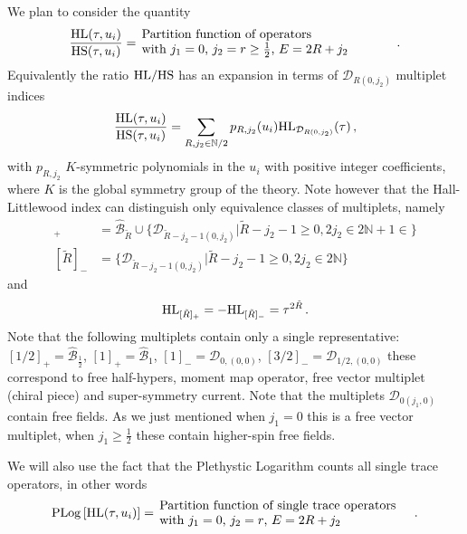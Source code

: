 \documentclass[main.tex]{subfiles}
\begin{document}
We plan to consider the quantity
\begin{equation}
\frac{\HL(\tau,u_i)}{\HS(\tau,u_i)}=\,\parbox{20em}{Partition function of operators \\with  $j_1=0$, $j_2=r\geq\frac{1}{2}$, $E=2R+j_2$}\,.
\end{equation}
Equivalently the ratio $\textrm{HL}/\textrm{HS}$ has an expansion in terms of $\mathcal{D}_{R(0,j_2)}$ multiplet indices
\begin{equation}
\frac{\textrm{HL}(\tau,u_i)}{\textrm{HS}(\tau,u_i)}=\sum_{R,j_2\in\mathbb{N}/2}p_{R,j_2}(u_i)\textrm{HL}_{\mathcal{D}_{R(0,j_2)}}(\tau)\,,
\end{equation}
with $p_{R,j_2}$ $K$-symmetric polynomials in the $u_i$ with positive integer coefficients, where $K$ is the global symmetry group of the theory.
Note however that the Hall-Littlewood index can distinguish only equivalence classes of multiplets, namely
\begin{align}
[\tilde{R}]_+&=\hat{\mathcal{B}}_{\tilde{R}}\cup\{\mathcal{D}_{\tilde{R}-j_2-1(0,j_2)}|\tilde{R}-j_2-1\geq0,2j_2\in2\mathbb{N}+1\in\}\\
[\tilde{R}]_-&=\{\mathcal{D}_{\tilde{R}-j_2-1(0,j_2)}|\tilde{R}-j_2-1\geq0,2j_2\in2\mathbb{N}\}
\end{align}
and
\begin{equation}
\textrm{HL}_{[\tilde{R}]_+}=-\textrm{HL}_{[\tilde{R}]_-}=\tau^{2\tilde{R}}\,.
\end{equation}
Note that the following multiplets contain only a single representative: $[1/2]_+=\hat{\mathcal{B}}_{\frac{1}{2}}$, $[1]_+=\hat{\mathcal{B}}_1$,  $[1]_-=\mathcal{D}_{0,(0,0)}$, $[3/2]_-=\mathcal{D}_{1/2,(0,0)}$ these correspond to free half-hypers, moment map operator, free vector multiplet (chiral piece) and super-symmetry current. Note that the multiplets $\mathcal{D}_{0(j_1,0)}$ contain free fields. As we just mentioned when $j_1=0$ this is a free vector multiplet, when $j_1\geq\frac{1}{2}$ these contain higher-spin free fields.

We will also use the fact that the Plethystic Logarithm counts all single trace operators, in other words
\begin{align}
\PLog\left[\HL(\tau,u_i)\right]=\,\parbox{20em}{Partition function of single trace operators\newline with  $j_1=0$, $j_2=r$, $E=2R+j_2$ }\,.
\end{align}
\end{document}
